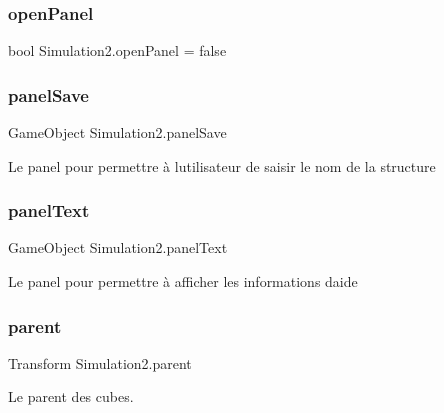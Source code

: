 \subsubsection{\texorpdfstring{open\+Panel}{openPanel}}
{\footnotesize\ttfamily bool Simulation2.\+open\+Panel = false}

\mbox{\label{class_simulation2_adfadcc7cb6f6be95e7280e4bdafb8eaa}} 
\subsubsection{\texorpdfstring{panel\+Save}{panelSave}}
{\footnotesize\ttfamily Game\+Object Simulation2.\+panel\+Save}



Le panel pour permettre à l\textquotesingle{}utilisateur de saisir le nom de la structure 

\mbox{\label{class_simulation2_ae3c3d1bfed4939037239dc36e4f48c01}} 
\subsubsection{\texorpdfstring{panel\+Text}{panelText}}
{\footnotesize\ttfamily Game\+Object Simulation2.\+panel\+Text}



Le panel pour permettre à afficher les informations d\textquotesingle{}aide 

\mbox{\label{class_simulation2_a19e139de68ecbb0b30e9f13bd4da6ae5}} 
\subsubsection{\texorpdfstring{parent}{parent}}
{\footnotesize\ttfamily Transform Simulation2.\+parent}



Le parent des cubes. 

\mbox{\label{class_simulation2_a65e50727f755df30407afa8b931e10c0}} 
